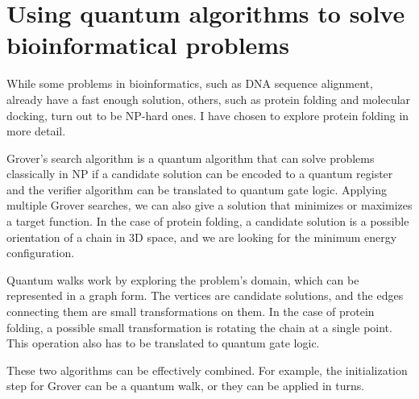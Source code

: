 \section{Using quantum algorithms to solve bioinformatical problems}

While some problems in bioinformatics, such as DNA sequence alignment, already have a fast enough solution, others, such as protein folding and molecular docking, turn out to be NP-hard ones. I have chosen to explore protein folding in more detail.

Grover's search algorithm is a quantum algorithm that can solve problems classically in NP if a candidate solution can be encoded to a quantum register and the verifier algorithm can be translated to quantum gate logic. Applying multiple Grover searches, we can also give a solution that minimizes or maximizes a target function. In the case of protein folding, a candidate solution is a possible orientation of a chain in 3D space, and we are looking for the minimum energy configuration.

Quantum walks work by exploring the problem's domain, which can be represented in a graph form. The vertices are candidate solutions, and the edges connecting them are small transformations on them. In the case of protein folding, a possible small transformation is rotating the chain at a single point. This operation also has to be translated to quantum gate logic.

These two algorithms can be effectively combined. For example, the initialization step for Grover can be a quantum walk, or they can be applied in turns.
